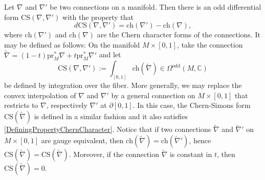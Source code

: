 \documentclass[a4paper]{book}
\newcommand{\bC}{\mathbb{C}}
\newcommand{\ch}{\mathrm{ch}}
\theoremstyle{definition}
\theoremstyle{remark}
\numberwithin{equation}{section}
\begin{document}
Let $\nabla$ and $\nabla'$ be two connections on a manifold. Then there is an odd differential form $\mathrm{CS}(\nabla, \nabla')$ with the property that
\begin{equation}
\label{DefiningPropertyChernCharacter}
d \mathrm{CS}(\nabla, \nabla') = \ch(\nabla') - \ch(\nabla),
\end{equation}
where $\ch(\nabla')$ and $\ch(\nabla)$ are the Chern character forms of the connections. It may be defined as follows: On the manifold $M \times [0, 1]$, take the connection $\tilde{\nabla} = (1-t)\mathrm{pr}_M^*\nabla + t\mathrm{pr}_M^*\nabla'$ and let
\[
\mathrm{CS}(\nabla, \nabla') := \int_{[0, 1]}\ch(\tilde{\nabla}) \in \Omega^{\mathrm{odd}}(M, \bC) 
\]
be defined by integration over the fiber. More generally, we may replace the convex interpolation of $\nabla$ and $\nabla'$ by a general connection on $M \times [0, 1]$ that restricts to $\nabla$, respectively $\nabla'$ at $\partial [0, 1]$. In this case, the Chern-Simons form $\mathrm{CS}(\tilde{\nabla})$ is defined in a similar fashion and it also satisfies \cref{DefiningPropertyChernCharacter}. Notice that if two connections $\tilde{\nabla}$ and $\tilde{\nabla}'$ on $M \times [0, 1]$ are gauge equivalent, then $\ch(\tilde{\nabla}) = \ch(\tilde{\nabla}')$, hence $\mathrm{CS}(\tilde{\nabla}) = \mathrm{CS}(\tilde{\nabla})$. Moreover, if the connection $\tilde{\nabla}$ is constant in $t$, then $\mathrm{CS}(\tilde{\nabla}) = 0$.


\end{document}
